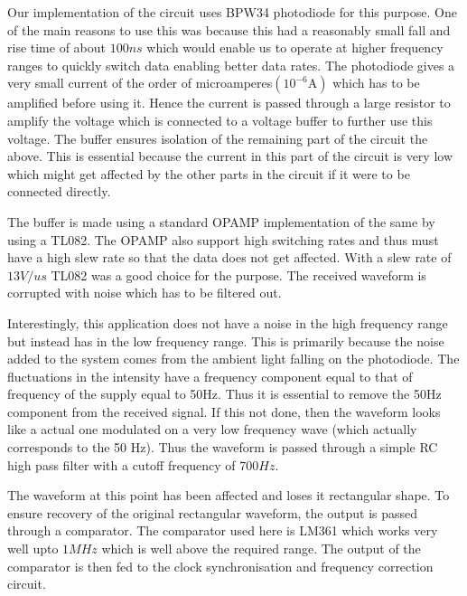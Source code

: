 \documentclass{article}
\begin{document}
Our implementation of the circuit uses BPW34 photodiode for this purpose. One of the main reasons to use this was because this had a reasonably small fall and rise time of about $100ns$ which would enable us to operate at higher frequency ranges to quickly switch data enabling better data rates. The photodiode gives a very small current of the order of microamperes$(10^{-6}\text{A})$ which has to be amplified before using it. Hence the current is passed through a large resistor to amplify the voltage which is connected to a voltage buffer to further use this voltage. The buffer ensures isolation of the remaining part of the circuit the above. This is essential because the current in this part of the circuit is very low which might get affected by the other parts in the circuit if it were to be connected directly.

The buffer is made using a standard OPAMP implementation of the same by using a TL082. The OPAMP also support high switching rates and thus must have a high slew rate so that the data does not get affected. With a slew rate of $13V/us$ TL082 was a good choice for the purpose. The received waveform is corrupted with noise which has to be filtered out.

Interestingly, this application does not have a noise in the high frequency range but instead has in the low frequency range. This is primarily because the noise added to the system comes from the ambient light falling on the photodiode. The fluctuations in the intensity have a frequency component equal to that of frequency of the supply equal to 50Hz. Thus it is essential to remove the 50Hz component from the received signal. If this not done, then the waveform looks like a actual one modulated on a very low frequency wave (which actually corresponds to the 50 Hz).  Thus the waveform is passed through a simple RC high pass filter with a cutoff frequency of $700 Hz$.

The waveform at this point has been affected and loses it rectangular shape. To ensure recovery of the original rectangular waveform, the output is passed through a comparator. The comparator used here is LM361 which works very well upto $1 MHz$ which is well above the required range. The output of the comparator is then fed to the clock synchronisation and frequency correction circuit.
\end{document}
